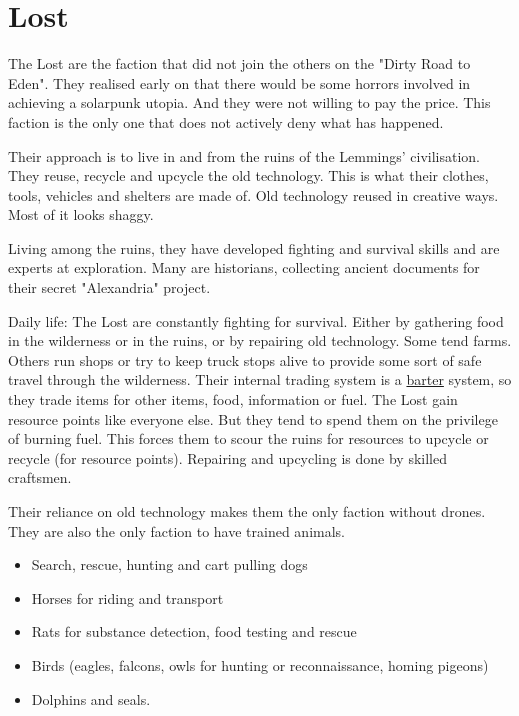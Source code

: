 \section{Lost}
\label{sec:Lost}

The Lost are the faction that did not join the others on the "Dirty Road to Eden". They realised early on that there would be some horrors involved in achieving a solarpunk utopia. And they were not willing to pay the price. This faction is the only one that does not actively deny what has happened.

Their approach is to live in and from the ruins of the Lemmings' civilisation. They reuse, recycle and upcycle the old technology. This is what their clothes, tools, vehicles and shelters are made of. Old technology reused in creative ways. Most of it looks shaggy.

Living among the ruins, they have developed fighting and survival skills and are experts at exploration.
Many are historians, collecting ancient documents for their secret "Alexandria" project.

Daily life: The Lost are constantly fighting for survival. Either by gathering food in the wilderness or in the ruins, or by repairing old technology. Some tend farms. Others run shops or try to keep truck stops alive to provide some sort of safe travel through the wilderness. Their internal trading system is a \hyperref[sec:Barter]{barter} system, so they trade items for other items, food, information or fuel.
The Lost gain resource points like everyone else. But they tend to spend them on the privilege of burning fuel. This forces them to scour the ruins for resources to upcycle or recycle (for resource points). Repairing and upcycling is done by skilled craftsmen.

Their reliance on old technology makes them the only faction without drones. They are also the only faction to have trained animals.

\begin{itemize}
    \item Search, rescue, hunting and cart pulling dogs
    \item Horses for riding and transport
    \item Rats for substance detection, food testing and rescue
    \item Birds (eagles, falcons, owls for hunting or reconnaissance, homing pigeons)
    \item Dolphins and seals.
\end{itemize}

